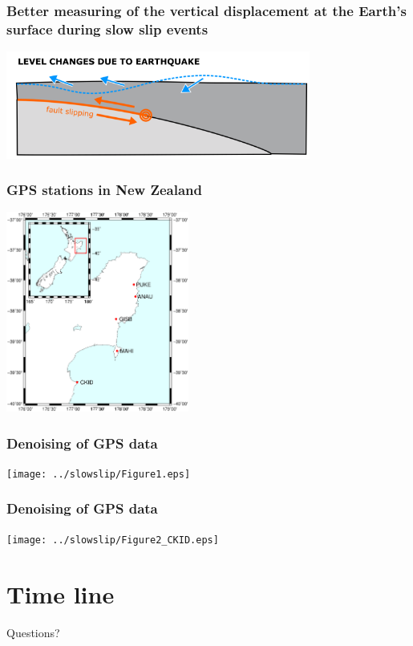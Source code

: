 \documentclass{beamer}
\begin{document}
	\begin{frame}
		\frametitle{Better measuring of the vertical displacement at the Earth’s surface during slow slip events}
		\begin{center}
			\includegraphics[trim={0cm 0cm 0cm 0cm}, clip, width=10cm]{slowslip/Postquake_level_changes_shallow_thrust.png}
		\end{center}
	\end{frame}

	\begin{frame}
		\frametitle{GPS stations in New Zealand}
		\begin{center}
			\includegraphics[trim={1cm 3cm 2cm 6cm}, clip, width=6cm]{Hikurangi/studyarea.eps}
		\end{center}
	\end{frame}

	\begin{frame}
		\frametitle{Denoising of GPS data}
		\begin{center}
			\texttt{[image: ../slowslip/Figure1.eps]}
		\end{center}
	\end{frame}

	\begin{frame}
		\frametitle{Denoising of GPS data}
		\begin{center}
			\texttt{[image: ../slowslip/Figure2\_CKID.eps]}
		\end{center}
	\end{frame}


	\section{Time line}

	\begin{frame}
		\begin{Huge}
			\begin{center}
				Questions?
			\end{center}
		\end{Huge}
	\end{frame}
			
\end{document}
